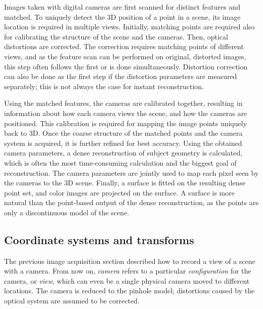 Images taken with digital cameras are first scanned for distinct features and matched.
To uniquely detect the 3D position of a point in a scene, its image location is required in multiple views.
Initially, matching points are required also for calibrating the structure of the scene and the cameras.
Then, optical distortions are corrected.
The correction requires matching points of different views, and as the feature scan can be performed on original, distorted images, this step often follows the first or is done simultaneously.
Distortion correction can also be done as the first step if the distortion parameters are measured separately; this is not always the case for instant reconstruction.

Using the matched features, the cameras are calibrated together, resulting in information about how each camera views the scene, and how the cameras are positioned.
This calibration is required for mapping the image points uniquely back to 3D.
Once the coarse structure of the matched points and the camera system is acquired, it is further refined for best accuracy.
Using the obtained camera parameters, a dense reconstruction of subject geometry is calculated, which is often the most time-consuming calculation and the biggest goal of reconstruction.
The camera parameters are jointly used to map each pixel seen by the cameras to the 3D scene.
Finally, a surface is fitted on the resulting dense point set, and color images are projected on the surface.
A surface is more natural than the point-based output of the dense reconstruction, as the points are only a discontinuous model of the scene.



\subsection{Coordinate systems and transforms} \label{sec:coord} %


The previous image acquisition section described how to record a view of a scene with a camera.
From now on, \emph{camera} refers to a particular \emph{configuration} for the camera, or \emph{view}, which can even be a single physical camera moved to different locations.
The camera is reduced to the pinhole model; distortions caused by the optical system are assumed to be corrected.

